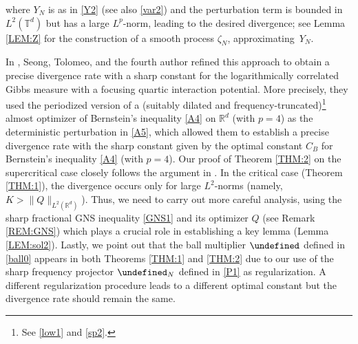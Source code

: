 \documentclass[letterpaper, 11pt,  reqno]{amsart}
\newcommand{\noi}{\noindent}
\newcommand{\R}{\mathbb{R}}
\newcommand{\T}{\mathbb{T}}
\let\P= \undefined
\newcommand{\P}{\mathbf{P}}
\numberwithin{equation}{section}
\numberwithin{theorem}{section}
\newcommand{\ze}{\zeta}
\begin{document}
\noi
 where $Y_N$ is as in \eqref{Y2} (see also \eqref{var2})
and 
 the perturbation term  is bounded in 
$L^2(\T^d)$ but  has a large $L^p$-norm, 
leading to the desired divergence;
see Lemma \ref{LEM:Z} for the construction of
a smooth process $\ze_N$, approximating~$Y_N$.


In \cite{OST}, 
Seong, Tolomeo, and the fourth author
refined this approach to obtain 
a precise divergence rate 
with a sharp constant
for the logarithmically correlated Gibbs measure 
with a focusing quartic interaction potential.
More precisely, 
they 
used
the periodized version of  
a (suitably dilated and frequency-truncated)\footnote{See \eqref{low1} and \eqref{sp2}.}
almost optimizer of 
Bernstein's inequality \eqref{A4} on $\R^d$
(with $p = 4$)
as the deterministic perturbation in \eqref{A5}, 
which allowed them to 
establish a precise divergence rate 
with  the sharp constant
given by 
 the optimal constant $C_B$ for Bernstein's inequality 
 \eqref{A4} (with $p = 4$).
Our proof of  
Theorem \ref{THM:2}
on 
the  supercritical case 
closely follows the argument in \cite{OST}.
In the critical case 
(Theorem \ref{THM:1}), 
the divergence occurs only 
for large $L^2$-norms (namely, $K > \|Q\|_{L^2(\R^d)}$).
Thus, 
we need to carry out more careful
analysis, 
using the sharp fractional GNS inequality \eqref{GNS1}
and its optimizer $Q$ (see Remark \ref{REM:GNS})
which plays a crucial role in establishing a key lemma
(Lemma \ref{LEM:sol2}).
Lastly, 
we point out that the ball multiplier
$\P$ defined in \eqref{ball0}
appears in both Theorems \ref{THM:1} and \ref{THM:2}
due to our use of the sharp frequency projector
$\P_N$ defined in \eqref{P1}
as regularization.
A different regularization procedure leads
to a different optimal constant but the divergence
rate should remain the same.
\end{document}
